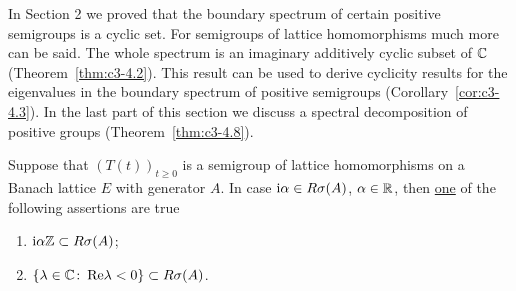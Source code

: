 In Section 2 we proved that the boundary spectrum of certain positive semigroups is a cyclic set. 
For semigroups of lattice homomorphisms much more can be said. The whole spectrum is an imaginary additively cyclic subset of $\mathbb{C} $ (\cf Theorem~\ref{thm:c3-4.2}). 
This result can be used to derive cyclicity results for the eigenvalues in the boundary spectrum of positive semigroups (\cf Corollary~\ref{cor:c3-4.3}). 
In the last part of this section we discuss a spectral decomposition of positive groups (\cf Theorem~\ref{thm:c3-4.8}).

\begin{lemma}\label{lem:c3-4.1}
	Suppose that $(T(t))_{t \ge 0}$ is a semigroup of lattice homomorphisms on a Banach lattice $E$ with generator $A$.
	In case $\mathrm{i}\alpha \in R\sigma(A)$, $\alpha \in \mathbb{R} $, then \underline{one} of the following assertions are true
	\begin{enumerate}[\upshape (a)]
		\item $\mathrm{i}\alpha\mathbb{Z} \subset R\sigma(A)$;
		\item $\{\lambda \in \mathbb{C}  \colon \mathop{}\!\mathrm{Re} \lambda < 0 \} \subset R\sigma(A)$.
	\end{enumerate}
\end{lemma}
